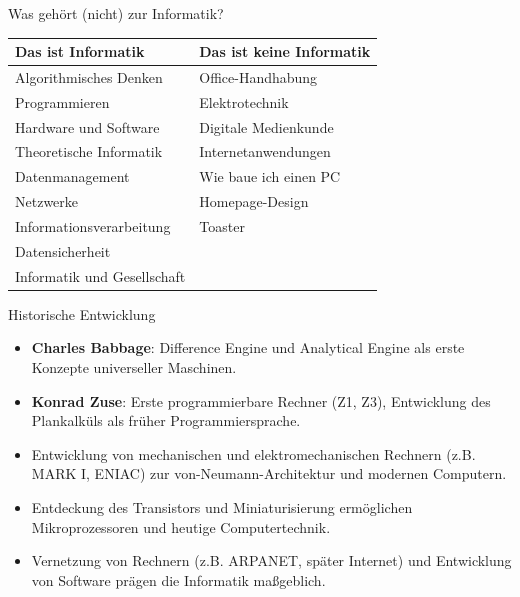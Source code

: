 \documentclass{article}
\begin{document}
\begin{block}{Was gehört (nicht) zur Informatik?}
    \centering
    \begin{tabular}{|p{5cm}|p{5cm}|}
        \hline
        \textbf{Das ist Informatik} & \textbf{Das ist keine Informatik} \\
        \hline
        Algorithmisches Denken & Office-Handhabung \\
        Programmieren & Elektrotechnik \\
        Hardware und Software & Digitale Medienkunde \\
        Theoretische Informatik & Internetanwendungen \\
        Datenmanagement & Wie baue ich einen PC \\
        Netzwerke & Homepage-Design \\
        Informationsverarbeitung & Toaster \\
        Datensicherheit & \\
        Informatik und Gesellschaft & \\
        \hline
    \end{tabular}
\end{block}

\begin{block}{Historische Entwicklung}
    \begin{itemize}
        \item \textbf{Charles Babbage}: Difference Engine und Analytical Engine als erste Konzepte universeller Maschinen.
        \item \textbf{Konrad Zuse}: Erste programmierbare Rechner (Z1, Z3), Entwicklung des Plankalküls als früher Programmiersprache.
        \item Entwicklung von mechanischen und elektromechanischen Rechnern (z.B. MARK I, ENIAC) zur von-Neumann-Architektur und modernen Computern.
        \item Entdeckung des Transistors und Miniaturisierung ermöglichen Mikroprozessoren und heutige Computertechnik.
        \item Vernetzung von Rechnern (z.B. ARPANET, später Internet) und Entwicklung von Software prägen die Informatik maßgeblich.
    \end{itemize}
\end{block}
\end{document}
